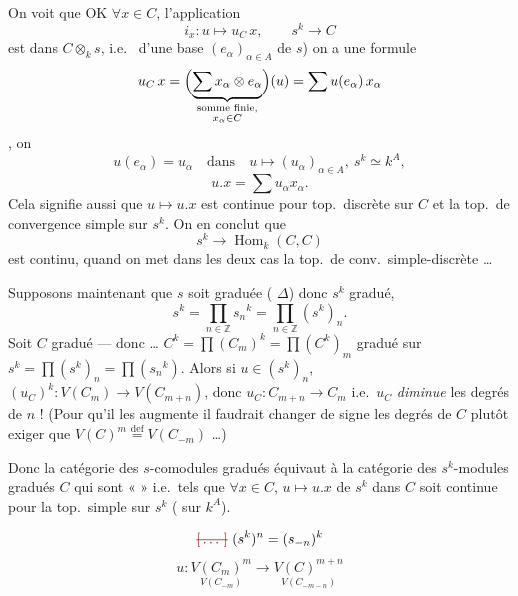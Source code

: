 \documentclass[11pt,a4paper]{article}
\begin{document}
On voit que  OK  $\forall x \in C$, l'application
\[
  i_x : u \longmapsto u_C\, x , \qquad s^k \longrightarrow C
\]
est dans $C \otimes_k s$, \struck{\ill{}} i.e.\  d'une base $(e_\alpha)_{\alpha \in A}$ de $s$) on a une formule
\[
  u_C\, x = \Bigl(\underbrace{\sum x_\alpha \otimes e_\alpha}_{\substack{\text{somme finie,} \\ x_\alpha \in C}}\Bigr)(u) = \sum u(e_\alpha)\, x_\alpha
\]
, on 
\[
  u(e_\alpha) = u_\alpha \quad \text{dans} \quad u \longmapsto (u_\alpha)_{\alpha \in A} ,\ s^k \simeq k^A ,
\]
\[
  u . x = \sum u_\alpha x_\alpha .
\]
Cela signifie aussi que $u \mapsto u.x$ est continue pour  top.\ discrète sur $C$ et la top.\ de convergence simple sur $s^k$. On en conclut que
\[
  s^k \longrightarrow \operatorname{Hom}_k(C, C)
\]
est continu, quand on met dans les deux cas la top.\ de conv.\ simple-discrète …

Supposons maintenant que $s$ soit graduée  ( $\Delta$) donc $s^k$ gradué,
\[
  s^k = \prod_{n \in \mathbb{Z}} {s_n}^k = \prod_{n \in \mathbb{Z}} (s^k)_n .
\]
Soit $C$   gradué --- donc …
$C^k = \prod (C_m)^k = \prod (C^k)_m$  gradué sur $s^k = \prod (s^k)_n = \prod ({s_n}^k)$.
Alors  si $u \in (s^k)_n$, $(u_C)^k : V(C_m) \to V(C_{m+n})$,
donc $u_C : C_{m+n} \to C_m$ i.e.\ $u_C$ \emph{diminue} les degrés de $n$ ! (Pour qu'il les augmente il faudrait changer de signe les degrés de $C$ \struck{\ill{}}  plutôt exiger que $V(C)^m \overset{\mathrm{def}}{=} V(C_{-m})$ …)

Donc la catégorie des $s$-comodules gradués équivaut à la catégorie des $s^k$-modules gradués $C$ \struck{\ill{}} qui sont « \struck{\ill{}}  » i.e.\ tels que $\forall x \in C$, $u \mapsto u.x$ de $s^k$ dans $C$ soit continue pour la top.\ simple sur $s^k$ (\struck{$=$}  sur $k^A$).

\[
  \text{\struck{\ill{}}}\ (s^k)^n = (s_{-n})^k
\]
\[
  u : \underset{V(C_{-m})}{V(C_m)^m} \longrightarrow \underset{V(C_{-m-n})}{V(C)^{m+n}}
\]
\end{document}
